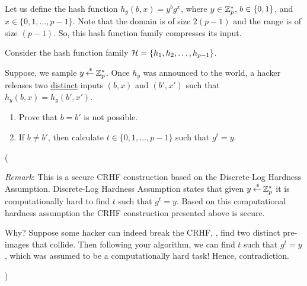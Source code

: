 \documentclass[11pt]{article}
\begin{document}
\begin{enumerate}
  Let us define the hash function $h_y (b,x) = y^b g^x$, where $y\in{\mathbb Z}_p^*$, $b\in{\{0,1\}}$, and $x\in\{0,1,\dotsc,p-1\}$. 
  Note that the domain is of size $2(p-1)$ and the range is of size $(p-1)$. 
  So, this hash function family compresses its input. 
  
  Consider the hash function family ${\mathcal H} = \{h_1,h_2,\dotsc,h_{p-1}\}$. 
  
  Suppose, we sample $y\mathbin{\stackrel{\mbox{\,\tiny \$}}{\gets}}{\mathbb Z}_p^*$.
  Once $h_y$ was announced to the world, a hacker releases two \underline{distinct} inputs $(b,x)$ and $(b',x')$ such that $h_y(b,x)=h_y(b',x')$. 
  
  \begin{enumerate}
  \item Prove that $b=b'$ is not possible. 
  \item If $b\neq b'$, then calculate $t\in\{0,1,\dotsc,p-1\}$ such that $g^t=y$. 
  \end{enumerate}
  
  ({\footnotesize{\em Remark}: This is a secure CRHF construction based on the Discrete-Log Hardness Assumption. Discrete-Log Hardness Assumption states that given $y\mathbin{\stackrel{\mbox{\,\tiny \$}}{\gets}}{\mathbb Z}_p^*$ it is computationally hard to find $t$ such that $g^t=y$. Based on this computational hardness assumption the CRHF construction presented above is secure. 
  
  Why? Suppose some hacker can indeed break the CRHF, \ie, find two distinct pre-images that collide. Then following your algorithm, we can find $t$ such that $g^t=y$, which was assumed to be a computationally hard task! Hence, contradiction.}) 



 
 



\end{enumerate}
\end{document}
